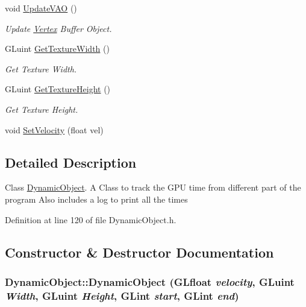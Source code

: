 \begin{CompactItemize}
void \hyperlink{class_dynamic_object_cc2b12c7d159ced09674c2146cde899b}{UpdateVAO} ()
\begin{CompactList}\small\item\em Update \hyperlink{class_vertex}{Vertex} Buffer Object. \item\end{CompactList}\item 
GLuint \hyperlink{class_dynamic_object_dacee7650d9d71a9f1ea7dc6a3c9c774}{GetTextureWidth} ()
\begin{CompactList}\small\item\em Get Texture Width. \item\end{CompactList}\item 
GLuint \hyperlink{class_dynamic_object_86d1a6d8afebc7d9499fe7a26a1faaf1}{GetTextureHeight} ()
\begin{CompactList}\small\item\em Get Texture Height. \item\end{CompactList}\item 
void \hyperlink{class_dynamic_object_056fb17fa06596d19a9fd3a269cb9da3}{SetVelocity} (float vel)
\end{CompactItemize}


\subsection{Detailed Description}
Class \hyperlink{class_dynamic_object}{DynamicObject}. A Class to track the GPU time from different part of the program Also includes a log to print all the times 

Definition at line 120 of file DynamicObject.h.

\subsection{Constructor \& Destructor Documentation}
\hypertarget{class_dynamic_object_ded38f8769ea3994d03742f79f72ee07}{
\subsubsection[DynamicObject]{\setlength{\rightskip}{0pt plus 5cm}DynamicObject::DynamicObject (GLfloat {\em velocity}, \/  GLuint {\em Width}, \/  GLuint {\em Height}, \/  GLint {\em start}, \/  GLint {\em end})}}
\label{class_dynamic_object_ded38f8769ea3994d03742f79f72ee07}


